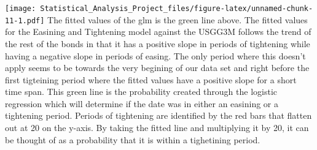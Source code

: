 \documentclass[]{article}
\newenvironment{Shaded}{\begin{snugshade}}{\end{snugshade}}
\newcommand{\KeywordTok}[1]{\textcolor[rgb]{0.13,0.29,0.53}{\textbf{#1}}}
\newcommand{\DataTypeTok}[1]{\textcolor[rgb]{0.13,0.29,0.53}{#1}}
\newcommand{\DecValTok}[1]{\textcolor[rgb]{0.00,0.00,0.81}{#1}}
\newcommand{\StringTok}[1]{\textcolor[rgb]{0.31,0.60,0.02}{#1}}
\newcommand{\OperatorTok}[1]{\textcolor[rgb]{0.81,0.36,0.00}{\textbf{#1}}}
\newcommand{\NormalTok}[1]{#1}
\begin{document}
\begin{Shaded}
\end{Shaded}

\texttt{[image: Statistical\_Analysis\_Project\_files/figure-latex/unnamed-chunk-11-1.pdf]}
The fitted values of the glm is the green line above. The fitted values
for the Easining and Tightening model against the USGG3M follows the
trend of the rest of the bonds in that it has a positive slope in
periods of tightening while having a negative slope in periods of
easing. The only period where this doesn't apply seems to be towards the
very begining of our data set and right before the first tigteining
period where the fitted values have a positive slope for a short time
span. This green line is the probability created through the logistic
regression which will determine if the date was in either an easining or
a tightening period. Periods of tightening are identified by the red
bars that flatten out at 20 on the y-axis. By taking the fitted line and
multiplying it by 20, it can be thought of as a probability that it is
within a tighetining period.

\begin{Shaded}
\end{Shaded}
\end{document}
